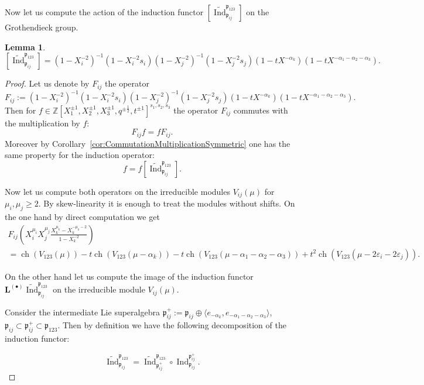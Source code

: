 \documentclass[10pt]{amsart}
\newtheorem{lemma}[theorem]{Lemma}
\newcommand{\fp}{{\mathfrak p}}
\newcommand{\LInd}{\mathbf{L}^{(\bullet)}\widetilde{\Ind}}
\DeclareMathOperator{\Ind}{Ind}
\DeclareMathOperator{\ch}{ch}
\begin{document}
	Now let us compute the action of the induction functor 
	$[\widetilde{\Ind}_{\fp_{ij}}^{\fp_{123}}]$ on the Grothendieck group.
	\begin{lemma}\label{lem:InductionOperator}
		\[[\widetilde{\Ind}_{\fp_{ij}}^{\fp_{123}}]=(1-X_{i}^{-2})^{-1}(1-X_{i}^{-2}s_i)(1-X_{j}^{-2})^{-1}(1-X_{j}^{-2}s_j)(1-tX^{-\alpha_k})(1-tX^{-\alpha_1-\alpha_2-\alpha_3}).\]
	\end{lemma}
	\begin{proof}
		Let us denote by $F_{ij}$ the operator 
		\begin{equation}\label{eq:FDefinition}
			F_{ij}:=(1-X_{i}^{-2})^{-1}(1-X_{i}^{-2}s_i)(1-X_{j}^{-2})^{-1}(1-X_{j}^{-2}s_j)(1-tX^{-\alpha_k})(1-tX^{-\alpha_1-\alpha_2-\alpha_3}).
		\end{equation}
		Then for $f \in \mathbb{Z}[X_1^{\pm 1},X_2^{\pm 1},X_3^{\pm 1},q^{\pm \frac{1}{2}},t^{\pm 1}]^{s_1,s_2,s_3}$ the operator $F_{ij}$ commutes with the multiplication by $f$:
		\[F_{ij} f =f F_{ij}.\]
		Moreover by Corollary~\ref{cor:CommutationMultiplicationSymmetric} one has
		the same property for the induction operator:
		\begin{equation*}
			[\widetilde{\Ind}_{\fp_{ij}}^{\fp_{123}}]f =f[\widetilde{\Ind}_{\fp_{ij}}^{\fp_{123}}].
		\end{equation*}
		
		Now let us compute both operators on the irreducible modules $V_{ij}(\mu)$ for $\mu_i,\mu_j\geq 2$. By skew-linearity it is enough to treat the modules without shifts. On the one hand by direct computation we get
		\begin{multline*}
			F_{ij}\left(X_i^{\mu_i}X_j^{\mu_j} \frac{X_k^{\mu_k}-X_k^{-\mu_k-2}}{1-X_k^{-2}}\right)\\=\ch(V_{123}(\mu))-t\ch(V_{123}(\mu-\alpha_k))-t\ch(V_{123}(\mu-\alpha_1-\alpha_2-\alpha_3))+t^2\ch(V_{123}(\mu-2\varepsilon_i-2\varepsilon_j)).
		\end{multline*}
		
		On the other hand let us compute the image of the induction functor $\LInd_{\fp_{ij}}^{\fp_{123}}$ on the irreducible module $V_{ij}(\mu)$.
		
		Consider the intermediate Lie superalgebra $\fp_{ij}^+:=\fp_{ij}\oplus \langle  e_{- \alpha_k}, e_{-\alpha_1-\alpha_2-\alpha_3}\rangle$, $\fp_{ij}\subset \fp_{ij}^+ \subset \fp_{123}$. Then by definition we have the following decomposition of the induction functor:
		
		\begin{equation}\label{eq:CompositionInductions}
			\widetilde{\Ind}_{\fp_{ij}}^{\fp_{123}}= \widetilde{\Ind}_{\fp_{ij}^+}^{\fp_{123}}\circ \Ind^{{\fp_{ij}^+}}_{\fp_{ij}}.
		\end{equation}
		

\end{proof}
\end{document}
